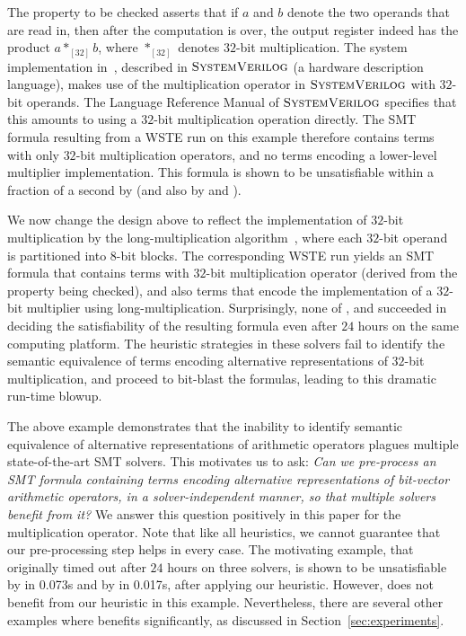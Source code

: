 The property to be checked asserts that if $a$ and $b$ denote the two
operands that are read in, then after the computation is over, the
output register indeed has the product $a *_{[32]} b$, where
$*_{[32]}$ denotes $32$-bit multiplication.  The system implementation
in~\cite{wste}, described in $\textsc{SystemVerilog}$ (a hardware description
language), makes use of the multiplication operator in $\textsc{SystemVerilog}$
with $32$-bit operands.  The Language Reference Manual of $\textsc{SystemVerilog}$
specifies that this amounts to using a $32$-bit multiplication
operation directly.  The SMT formula resulting from a WSTE run on this
example therefore contains terms with only $32$-bit multiplication
operators, and no terms encoding a lower-level multiplier
implementation.  This formula is shown to be unsatisfiable within a
fraction of a second by {\boolector} (and also by {\cvcfour} and
{\zthree}).%

We now change the design above to reflect the implementation of
$32$-bit multiplication by the long-multiplication
algorithm~\cite{long}, where each $32$-bit operand is partitioned into
$8$-bit blocks.  The corresponding WSTE run yields an SMT formula that
contains terms with $32$-bit multiplication operator (derived from the
property being checked), and also terms that encode the implementation
of a $32$-bit multiplier using long-multiplication.  Surprisingly,
none of {\boolector}, {\cvcfour} and {\zthree} succeeded in deciding
the satisfiability of the resulting formula even after $24$ hours on
the same computing platform.  The heuristic strategies in these
solvers fail to identify the semantic equivalence of terms encoding
alternative representations of $32$-bit multiplication, and proceed
to bit-blast the formulas, leading to this dramatic run-time blowup.

The above example demonstrates that the inability to identify semantic
equivalence of alternative representations of arithmetic operators
plagues multiple state-of-the-art SMT solvers.  %
This motivates us to ask: \emph{Can we pre-process an SMT formula
containing terms encoding alternative representations of bit-vector
arithmetic operators, in a solver-independent manner, so that multiple
solvers benefit from it?}  We answer this question positively in this
paper for the multiplication operator.  Note that like all heuristics,
we cannot guarantee that our pre-processing step helps in every case.
The motivating example, that originally timed out after $24$ hours on
three solvers, is shown to be unsatisfiable by {\zthree} in 0.073s and
by {\cvcfour} in 0.017s, after applying our heuristic. However,
{\boolector} does not benefit from our heuristic in this example.
Nevertheless, there are several other examples where {\boolector}
benefits significantly, as discussed in Section~\ref{sec:experiments}.

